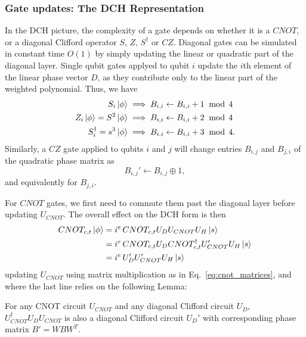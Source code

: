 \subsubsection*{Gate updates: The DCH Representation}
In the DCH picture, the complexity of a gate depends on whether it is a $CNOT$, or a diagonal Clifford operator $S$, $Z$, $S^{\dagger}$ or $CZ$. Diagonal gates can be simulated in constant time $O(1)$ by simply updating the linear or quadratic part of the diagonal layer. Single qubit gates applyed to qubit $i$ update the $i$th element of the linear phase vector $D$, as they contribute only to the linear part of the weighted polynomial. Thus, we have
\begin{align}
S_{i}\ket{\phi} &\implies B_{i,i}\leftarrow B_{i,i} + 1\;\bmod\,4 \\
Z_{i}\ket{\phi} = S^{2}\ket{\phi} &\implies B_{i,i}\leftarrow B_{i,i} +2\;\bmod\,4 \\
S_{i}^{\dagger} = s^{3}\ket{\phi} & \implies B_{i,i}\leftarrow B_{i,i} + 3\;\bmod\,4. 
\end{align}
Similarly, a $CZ$ gate applied to qubits $i$ and $j$ will change entries $B_{i,j}$ and $B_{j,i}$ of the quadratic phase matrix as
\begin{equation}
B_{i,j}' \leftarrow B_{i,j}\oplus 1,
\end{equation}
and equivalently for $B_{j,i}$.\par
For $CNOT$ gates, we first need to commute them past the diagonal layer before updating $U_{CNOT}$. The overall effect on the DCH form is then
\begin{align}
CNOT_{c,t}\ket{\phi} &= i^{e}\,CNOT_{c,t}U_{D}U_{CNOT}U_{H} \ket{s}\nonumber \\
&= i^{e}\,CNOT_{c,t}U_{D}CNOT_{c,t}^{\dagger} U_{CNOT}' U_{H}\ket{s} \nonumber \\
&= i^{e}\,U_{D}'U_{CNOT}'U_{H}\ket{s}
\end{align}
updating $U_{CNOT}$ using matrix multiplication as in Eq.~\ref{eq:cnot_matrices}, and where the last line relies on the following Lemma:
\begin{lem}
For any CNOT circuit $U_{CNOT}$ and any diagonal Clifford circuit $U_{D}$, $U_{CNOT}^{\dagger}U_{D}U_{CNOT}$ is also a diagonal Clifford circuit $U_{D}'$ with corresponding phase matrix $B'=WBW^{T}$.\label{lem:dc_conjugtation}
\end{lem}
